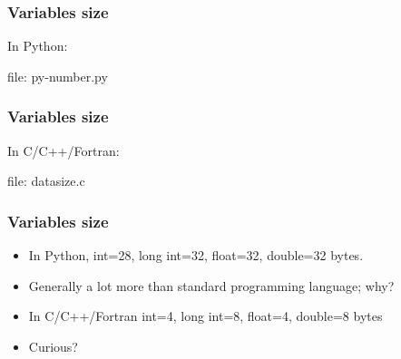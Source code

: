 \begin{frame}[fragile]
\frametitle{Variables size}
In Python:
\newcommand{\newfilename}{py-number.py}



file: \newfilename
\end{frame}

\begin{frame}[fragile]
\frametitle{Variables size}
In C/C++/Fortran:
\newcommand{\newfilename}{datasize.c}



file: \newfilename
\end{frame}

\begin{frame}[fragile]
\frametitle{Variables size}
\begin{itemize}
\item In Python, int=28, long int=32, float=32, double=32 bytes.
\item Generally a lot more than standard programming language; why?
\item In C/C++/Fortran int=4, long int=8, float=4, double=8 bytes
\item Curious?
\end{itemize}

\end{frame}